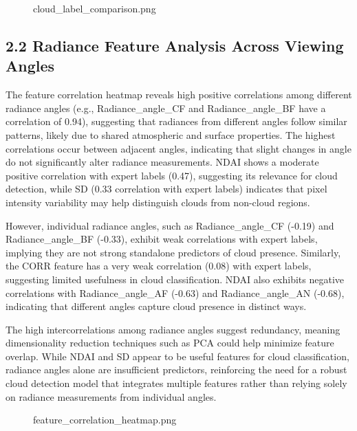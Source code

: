 \documentclass[11pt]{article}
\begin{document}
\begin{figure}
\centering
{}
\caption{cloud\_label\_comparison.png}
\end{figure}

    \subsection*{2.2 Radiance Feature Analysis Across Viewing
Angles}\label{radiance-feature-analysis-across-viewing-angles}

    The feature correlation heatmap reveals high positive correlations among
different radiance angles (e.g., Radiance\_angle\_CF and
Radiance\_angle\_BF have a correlation of 0.94), suggesting that
radiances from different angles follow similar patterns, likely due to
shared atmospheric and surface properties. The highest correlations
occur between adjacent angles, indicating that slight changes in angle
do not significantly alter radiance measurements. NDAI shows a moderate
positive correlation with expert labels (0.47), suggesting its relevance
for cloud detection, while SD (0.33 correlation with expert labels)
indicates that pixel intensity variability may help distinguish clouds
from non-cloud regions.

However, individual radiance angles, such as Radiance\_angle\_CF (-0.19)
and Radiance\_angle\_BF (-0.33), exhibit weak correlations with expert
labels, implying they are not strong standalone predictors of cloud
presence. Similarly, the CORR feature has a very weak correlation (0.08)
with expert labels, suggesting limited usefulness in cloud
classification. NDAI also exhibits negative correlations with
Radiance\_angle\_AF (-0.63) and Radiance\_angle\_AN (-0.68), indicating
that different angles capture cloud presence in distinct ways.

The high intercorrelations among radiance angles suggest redundancy,
meaning dimensionality reduction techniques such as PCA could help
minimize feature overlap. While NDAI and SD appear to be useful features
for cloud classification, radiance angles alone are insufficient
predictors, reinforcing the need for a robust cloud detection model that
integrates multiple features rather than relying solely on radiance
measurements from individual angles.

\begin{figure}
\centering
{}
\caption{feature\_correlation\_heatmap.png}
\end{figure}
\end{document}
